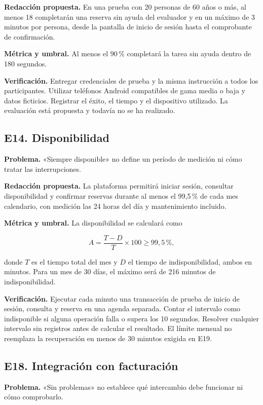 \documentclass[11pt,a4paper]{article}
\begin{document}
\textbf{Redacción propuesta.}
En una prueba con 20 personas de 60 años o más, al menos 18
completarán una reserva sin ayuda del evaluador y en un máximo de
3 minutos por persona, desde la pantalla de inicio de sesión hasta
el comprobante de confirmación.

\textbf{Métrica y umbral.}
Al menos el 90\,\% completará la tarea sin ayuda dentro
de 180 segundos.

\textbf{Verificación.}
Entregar credenciales de prueba y la misma instrucción a todos
los participantes. Utilizar teléfonos Android compatibles de gama
media o baja y datos ficticios. Registrar el éxito, el tiempo y el
dispositivo utilizado. La evaluación está propuesta y todavía
no se ha realizado.

\subsection{E14. Disponibilidad}

\textbf{Problema.}
«Siempre disponible» no define un período de medición ni cómo
tratar las interrupciones.

\textbf{Redacción propuesta.}
La plataforma permitirá iniciar sesión, consultar disponibilidad
y confirmar reservas durante al menos el 99,5\,\% de cada mes
calendario, con medición las 24 horas del día y mantenimiento incluido.

\textbf{Métrica y umbral.}
La disponibilidad se calculará como

\[
A=\frac{T-D}{T}\times100\geq99,5\,\%,
\]

donde $T$ es el tiempo total del mes y $D$ el tiempo de
indisponibilidad, ambos en minutos. Para un mes de 30 días,
el máximo será de 216 minutos de indisponibilidad.

\textbf{Verificación.}
Ejecutar cada minuto una transacción de prueba de inicio de sesión,
consulta y reserva en una agenda separada. Contar el intervalo
como indisponible si alguna operación falla o supera los 10 segundos.
Resolver cualquier intervalo sin registros antes de calcular
el resultado. El límite mensual no reemplaza la recuperación en
menos de 30 minutos exigida en E19.

\subsection{E18. Integración con facturación}

\textbf{Problema.}
«Sin problemas» no establece qué intercambio debe funcionar
ni cómo comprobarlo.
\end{document}
